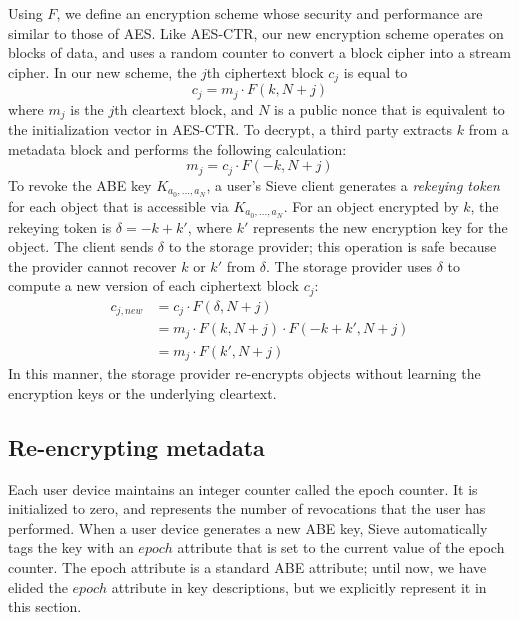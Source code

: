 Using $F$, we define an encryption scheme whose
security and performance are similar to those
of AES. Like AES-CTR, our new encryption scheme
operates on blocks of data, and uses a random
counter to convert a block cipher into a stream
cipher. In our new scheme, the $j$th ciphertext
block $c_j$ is equal to
  \begin{equation*}
    c_j = m_j \cdot F(k, N + j)
    \label{new_enc}
  \end{equation*}
where $m_j$ is the $j$th cleartext block, and
$N$ is a public nonce that is equivalent to the
initialization vector in AES-CTR. To decrypt,
a third party extracts $k$ from a metadata
block and performs the 
following calculation:
  \begin{equation*}
    m_j = c_j \cdot F(-k, N + j)
  \end{equation*}
To revoke the ABE key $K_{a_0,\ldots,a_N}$, a user's
Sieve client generates a \emph{rekeying token}
for each object that is accessible via
$K_{a_0,\ldots,a_N}$. For an object encrypted by
$k$, the rekeying token is $\delta = -k + k'$,
where $k'$ represents the new encryption key
for the object. The client sends $\delta$ to
the storage provider; this operation is safe
because the provider cannot recover $k$ or $k'$ 
from $\delta$. The storage provider
uses $\delta$ to compute a new version of
each ciphertext block $c_j$:
\begin{align*}
    c_{j,new} &= c_j \cdot F(\delta , N + j) \\
    &= m_j \cdot F(k, N+j) \cdot F(-k + k', N+j) \\
    &= m_j \cdot F(k', N+j)
\end{align*}
In this manner, the storage provider re-encrypts
objects without learning the encryption keys
or the underlying cleartext.

\subsection{Re-encrypting metadata} Each user
device maintains an integer counter called the
epoch counter. It is initialized to zero, and
represents the number of revocations that the
user has performed. When a user device
generates a new ABE key, Sieve automatically
tags the key with an $epoch$ attribute that
is set to the current value of the epoch
counter. The epoch attribute is a standard
ABE attribute; until now, we have elided the
$epoch$ attribute in key descriptions, but
we explicitly represent it in this section.

